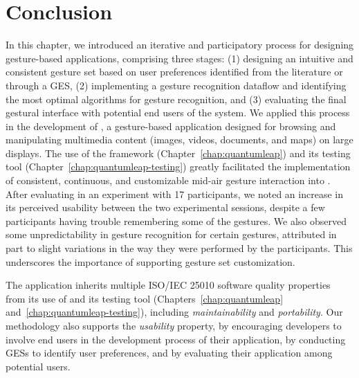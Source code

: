 \section{Conclusion} \label{sec:lui:conclusion}
In this chapter, we introduced an iterative and participatory process for designing gesture-based applications, comprising three stages: (1) designing an intuitive and consistent gesture set based on user preferences identified from the literature or through a GES, (2) implementing a gesture recognition dataflow and identifying the most optimal algorithms for gesture recognition, and (3) evaluating the final gestural interface with potential end users of the system.
%
We applied this process in the development of \lui, a gesture-based application designed for browsing and manipulating multimedia content (images, videos, documents, and maps) on large displays. The use of the \ql framework (Chapter~\ref{chap:quantumleap}) and its testing tool (Chapter~\ref{chap:quantumleap-testing}) greatly facilitated the implementation of consistent, continuous, and customizable mid-air gesture interaction into \lui.
%
After evaluating \lui in an experiment with 17 participants, we noted an increase in its perceived usability between the two experimental sessions, despite a few participants having trouble remembering some of the gestures. We also observed some unpredictability in gesture recognition for certain gestures, attributed in part to slight variations in the way they were performed by the participants. This underscores the importance of supporting gesture set customization.

The \lui application inherits multiple ISO/IEC 25010 software quality properties~\cite{iso25010} from its use of \ql and its testing tool (Chapters~\ref{chap:quantumleap} and~\ref{chap:quantumleap-testing}), including \textit{maintainability} and \textit{portability}.
%
Our methodology also supports the \textit{usability} property, by encouraging developers to involve end users in the development process of their application, by conducting GESs to identify user preferences, and by evaluating their application among potential users.

